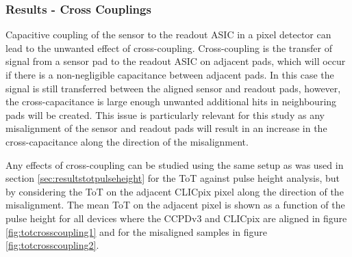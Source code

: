 \subsubsection{Results - Cross Couplings}
Capacitive coupling of the sensor to the readout ASIC in a pixel detector can lead to the unwanted effect of cross-coupling.  Cross-coupling is the transfer of signal from a sensor pad to the readout ASIC on adjacent pads, which will occur if there is a non-negligible capacitance between adjacent pads.  In this case the signal is still transferred between the aligned sensor and readout pads, however, the cross-capacitance is large enough unwanted additional hits in neighbouring pads will be created.  This issue is particularly relevant for this study as any misalignment of the sensor and readout pads will result in an increase in the cross-capacitance along the direction of the misalignment.   

Any effects of cross-coupling can be studied using the same setup as was used in section \ref{sec:resultstotpulseheight} for the ToT against pulse height analysis, but by considering the ToT on the adjacent CLICpix pixel along the direction of the misalignment.  The mean ToT on the adjacent pixel is shown as a function of the pulse height for all devices where the CCPDv3 and CLICpix are aligned in figure \ref{fig:totcrosscoupling1} and for the misaligned samples in figure \ref{fig:totcrosscoupling2}.

